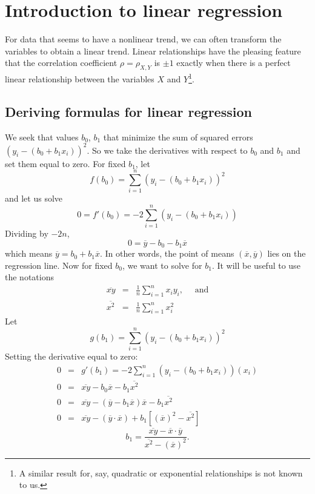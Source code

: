 \chapter{Introduction to linear regression}
\label{linRegrForTwoVar}


	For data that seems to have a nonlinear trend, we can often transform the variables to obtain a linear trend.
	Linear relationships have the pleasing feature that the correlation coefficient $\rho=\rho_{X,Y}$ is $\pm 1$ exactly when
	there is a perfect linear relationship between the variables $X$ and $Y$\footnote{
		A similar result for, say, quadratic or exponential relationships is not known to us.
	}.

\section{Deriving formulas for linear regression}
	We seek that values $b_0$, $b_1$ that minimize the sum of squared errors $(y_i-(b_0+b_1x_i))^2$.
	So we take the derivatives with respect to $b_0$ and $b_1$ and set them equal to zero.
	For fixed $b_1$, let
	\[
		f(b_0) = \sum_{i=1}^n (y_i-(b_0+b_1x_i))^2
	\]
	and let us solve
	\[
		0 = f'(b_0) = -2 \sum_{i=1}^n (y_i-(b_0+b_1x_i))
	\]
	Dividing by $-2n$,
	\[
		0 = \overline y - b_0 - b_1\overline x
	\]
	which means $\overline y = b_0+b_1\overline x$.
	In other words, the point of means $(\overline x,\overline y)$ lies on the regression line.
	Now for fixed $b_0$, we want to solve for $b_1$.
	It will be useful to use the notations
	\begin{eqnarray*}
	\overline{xy}  &=& \frac1n\sum_{i=1}^nx_iy_i,\quad\text{ and}\\
	\overline{x^2}&=& \frac1n\sum_{i=1}^nx_i^2
	\end{eqnarray*}
	Let
	\[
		g(b_1) = \sum_{i=1}^n (y_i-(b_0+b_1x_i))^2
	\]
	Setting the derivative equal to zero:
	\begin{eqnarray*}
		0 &=& g'(b_1) = -2 \sum_{i=1}^n (y_i-(b_0+b_1x_i))(x_i)\\
		0 &=& \overline{xy} - b_0\overline x - b_1\overline{x^2}\\
		0 &=& \overline{xy} - (\overline y-b_1\overline x)\overline x - b_1\overline{x^2}\\
		0 &=& \overline{xy} - (\overline y\cdot \overline x)+b_1[(\overline x)^2 - \overline{x^2}]
	\end{eqnarray*}
	\begin{equation}\label{b1}
		b_1 = \frac{\overline{xy} - \overline x\cdot\overline y}{\overline{x^2}-(\overline x)^2}.
	\end{equation}

